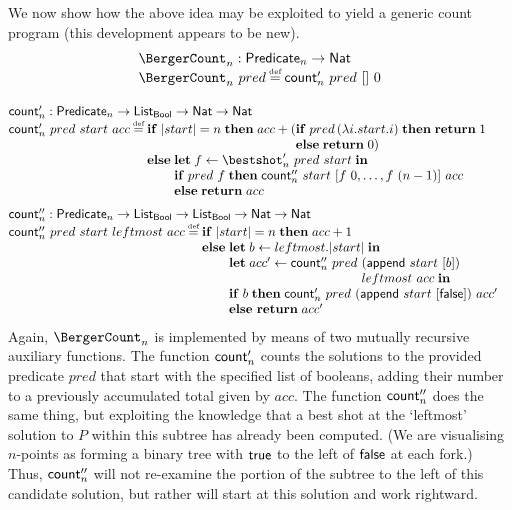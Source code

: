 \documentclass[12pt,phd,lfcs,twoside,openright,logo,leftchapter,normalheadings]{infthesis}
\theoremstyle{plain}
\theoremstyle{definition}
\begin{document}
We now show how the above idea may be exploited to yield a generic
count program (this development appears to be new).
%
\[
  \bl
    \BergerCount_n : \Predicate_n \to \Nat\\
    \BergerCount_n~pred \defas \Count'_n~pred~[]~0 \medskip\\
 \el
\]
\[
 \bl
    \Count'_n : \Predicate_n \to \List_\Bool \to \Nat \to \Nat\\
    \Count'_n~pred~start~acc \defas
      \ba[t]{@{}l}
         \If\; |start| = n\; \Then\; acc +
                   (\bl\If\; pred\,(\lambda i. start.i) \;\Then\;\Return\;1\\\Else\;\Return\;0)\el\\
         \Else\;
           \ba[t]{@{}l}
             \Let\; f \revto \bestshot'_n~pred~start\; \In\\
             \If\; pred~f \;\Then\; \Count''_n~start~ [f~0,\dots,f~(n-1)]~acc \\
             \Else\;\Return\;acc
           \ea
     \ea \medskip\\

    \Count''_n : \Predicate_n \to \List_\Bool \to \List_\Bool \to \Nat \to \Nat\\
    \Count''_n~pred~start~leftmost~acc \defas
      \ba[t]{@{}l}
         \If\; |start| = n \;\Then\; acc+1\\
         \Else\;
           \ba[t]{@{}l}
             \Let\; b \revto leftmost.|start|\; \In\\
             \Let\; acc' \revto \Count''_n~pred~\bl(\dec{append}~start~[b])\\leftmost~acc\; \In\el\\
             \If\; b \; \Then\; \Count'_n~pred~(\dec{append}~start~[\False])~acc'\\
             \Else~\Return\;acc'
           \ea
      \ea
  \el
\]%
%
Again, $\BergerCount_n$ is implemented by means of two mutually
recursive auxiliary functions.  The function $\mathsf{count}'_n$ counts the
solutions to the provided predicate $pred$ that start with the
specified list of booleans, adding their number to a previously
accumulated total given by $acc$.  The function $\mathsf{count}''_n$ does the
same thing, but exploiting the knowledge that a best shot at the
`leftmost' solution to $P$ within this subtree has already been
computed.  (We are visualising $n$-points as forming a binary tree
with $\mathsf{true}$ to the left of $\mathsf{false}$ at each fork.) Thus, $\mathsf{count}''_n$
will not re-examine the portion of the subtree to the left of this
candidate solution, but rather will start at this solution and work
rightward.
\end{document}
